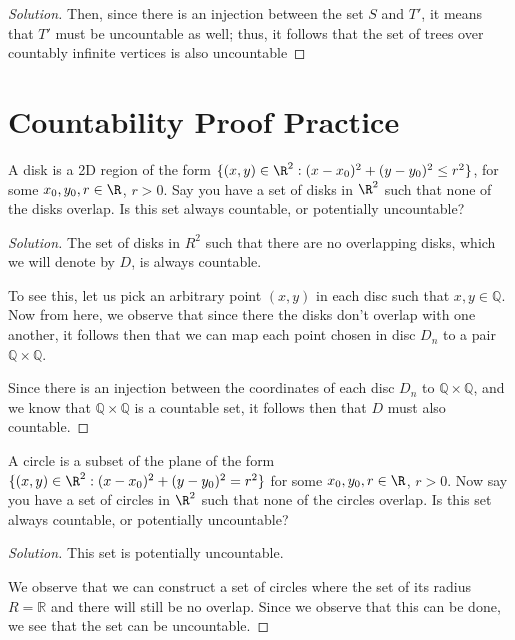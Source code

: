 \documentclass{article}
\newenvironment{solution}{\begin{proof}[Solution]}{\end{proof}}
\newcommand{\QQ}{\mathbb{Q}}
\newcommand{\RR}{\mathbb{R}}
\begin{document}
\begin{solution}
	Then, since there is an injection between the set $S$ and $T'$, it means that $T'$ must be uncountable as well; thus, it follows that the set of trees over countably infinite vertices is also uncountable
%	
\end{solution}

\section{Countability Proof Practice}
\begin{hw}
	A disk is a 2D region of the form $\{(x, y) \in \R^2 : (x - x_0)^2 + (y - y_0)^2 \le r^2\}$, for some $x_0, y_0, r \in \R$, $r > 0$.
	Say you have a set of disks in $\R^2$ such that none of the disks overlap.
	Is this set always countable, or potentially uncountable?
\end{hw}
\begin{solution}
	The set of disks in $R^{2}$ such that there are no overlapping disks, which we will denote by $D$, is always countable.
	
	To see this, let us pick an arbitrary point $(x,y)$ in each disc such that $x, y \in \QQ$. Now from here, we observe that since there the disks don't overlap with one another, it follows then that we can map each point chosen in disc $D_{n}$ to a pair $\QQ \times \QQ$.
	
	Since there is an injection between the coordinates of each disc $D_{n}$ to $\QQ \times \QQ$, and we know that $\QQ \times \QQ$ is a countable set, it follows then that $D$ must also countable.
\end{solution}

\begin{hw}
	A circle is a subset of the plane of the form $\{(x, y) \in \R^2 : (x - x_0)^2 + (y - y_0)^2 = r^2\}$ for some $x_0, y_0, r \in \R$, $r > 0$. Now say you have a set of circles in $\R^2$ such that none of the circles overlap. Is this set always countable, or potentially uncountable?
\end{hw}
\begin{solution}
	This set is potentially uncountable.
	
	We observe that we can construct a set of circles where the set of its radius $R = \RR$ and there will still be no overlap. Since we observe that this can be done, we see that the set can be uncountable.
\end{solution}
\end{document}

